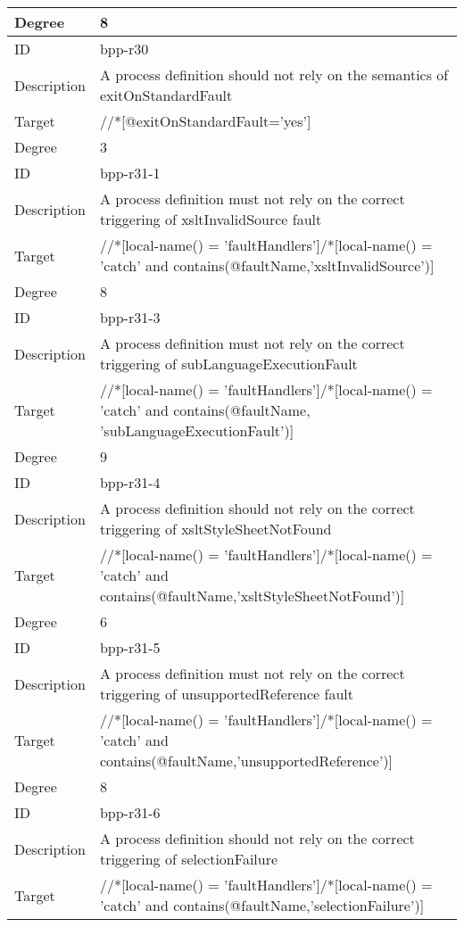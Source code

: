 \begin{center}
\begin{tiny}
\begin{longtable}{p{}|p{}}
\myrowcolour
Degree & 8\\
\midrule
ID & bpp-r30\\
\myrowcolour
Description &A process definition should not rely on the semantics of exitOnStandardFault\\
Target & //*[@exitOnStandardFault='yes']\\
\myrowcolour
Degree & 3\\
\midrule
ID & bpp-r31-1\\
\myrowcolour
Description &A process definition must not rely on the correct triggering of xsltInvalidSource fault\\
Target & //*[local-name() = 'faultHandlers']/*[local-name() = 'catch' and contains(@faultName,'xsltInvalidSource')]\\
\myrowcolour
Degree & 8\\
\midrule
ID & bpp-r31-3\\
\myrowcolour
Description &A process definition must not rely on the correct triggering of subLanguageExecutionFault\\
Target & //*[local-name() = 'faultHandlers']/*[local-name() = 'catch' and contains(@faultName, 'subLanguageExecutionFault')]\\
\myrowcolour
Degree & 9\\
\midrule
ID & bpp-r31-4\\
\myrowcolour
Description &A process definition should not rely on the correct triggering of xsltStyleSheetNotFound\\
Target & //*[local-name() = 'faultHandlers']/*[local-name() = 'catch' and contains(@faultName,'xsltStyleSheetNotFound')]\\
\myrowcolour
Degree & 6\\
\midrule
ID & bpp-r31-5\\
\myrowcolour
Description &A process definition must not rely on the correct triggering of unsupportedReference fault\\
Target & //*[local-name() = 'faultHandlers']/*[local-name() = 'catch' and contains(@faultName,'unsupportedReference')]\\
\myrowcolour
Degree & 8\\
\midrule
ID & bpp-r31-6\\
\myrowcolour
Description &A process definition should not rely on the correct triggering of selectionFailure\\
Target & //*[local-name() = 'faultHandlers']/*[local-name() = 'catch' and contains(@faultName,'selectionFailure')]\\

\end{longtable}
\end{tiny}
\end{center}
